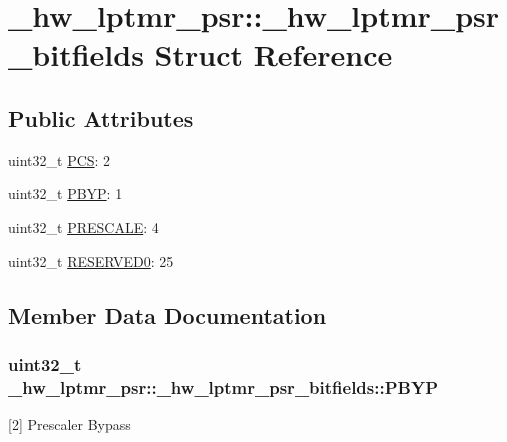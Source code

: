 \hypertarget{struct__hw__lptmr__psr_1_1__hw__lptmr__psr__bitfields}{}\section{\+\_\+hw\+\_\+lptmr\+\_\+psr\+:\+:\+\_\+hw\+\_\+lptmr\+\_\+psr\+\_\+bitfields Struct Reference}
\label{struct__hw__lptmr__psr_1_1__hw__lptmr__psr__bitfields}
\subsection*{Public Attributes}
\begin{DoxyCompactItemize}
\item 
uint32\+\_\+t \hyperlink{struct__hw__lptmr__psr_1_1__hw__lptmr__psr__bitfields_a3d993db71ade53cda87fdd760944e461}{P\+CS}\+: 2
\item 
uint32\+\_\+t \hyperlink{struct__hw__lptmr__psr_1_1__hw__lptmr__psr__bitfields_aa55237ba7854cedd71265fcd23be5caa}{P\+B\+YP}\+: 1
\item 
uint32\+\_\+t \hyperlink{struct__hw__lptmr__psr_1_1__hw__lptmr__psr__bitfields_ac527885cc4bac77eb8aef76aff1d8eb8}{P\+R\+E\+S\+C\+A\+LE}\+: 4
\item 
uint32\+\_\+t \hyperlink{struct__hw__lptmr__psr_1_1__hw__lptmr__psr__bitfields_a951991bdbc5b80c79a6a9b209fd12ac4}{R\+E\+S\+E\+R\+V\+E\+D0}\+: 25
\end{DoxyCompactItemize}


\subsection{Member Data Documentation}
\subsubsection[{\texorpdfstring{P\+B\+YP}{PBYP}}]{\setlength{\rightskip}{0pt plus 5cm}uint32\+\_\+t \+\_\+hw\+\_\+lptmr\+\_\+psr\+::\+\_\+hw\+\_\+lptmr\+\_\+psr\+\_\+bitfields\+::\+P\+B\+YP}\hypertarget{struct__hw__lptmr__psr_1_1__hw__lptmr__psr__bitfields_aa55237ba7854cedd71265fcd23be5caa}{}\label{struct__hw__lptmr__psr_1_1__hw__lptmr__psr__bitfields_aa55237ba7854cedd71265fcd23be5caa}
\mbox{[}2\mbox{]} Prescaler Bypass 
